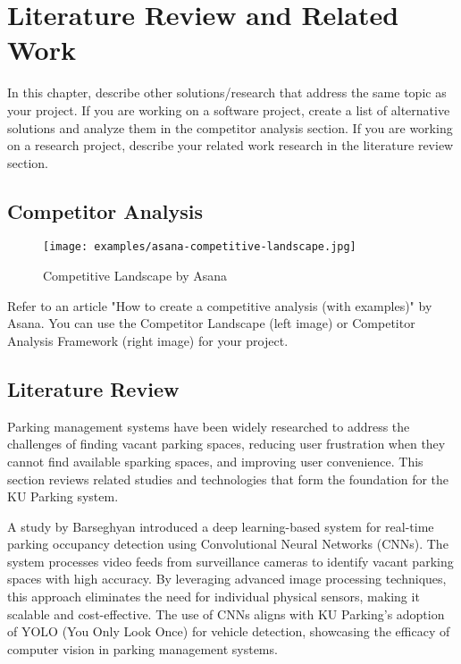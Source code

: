 \chapter{Literature Review and Related Work}
\label{chap:relatedworks}

In this chapter, describe other solutions/research that address the
same topic as your project. If you are working on a software project, create a
list of alternative solutions and analyze them in the competitor analysis section.
If you are working on a research project, describe your related work research in
the literature review section.

\section{Competitor Analysis}
\label{section:competitor-analysis}

\begin{figure}[h]
    \centering
    \texttt{[image: examples/asana-competitive-landscape.jpg]}
    \caption{Competitive Landscape by Asana}
\end{figure}

Refer to an article "How to create a competitive analysis (with
examples)" by Asana. You can use the Competitor Landscape (left image) or
Competitor Analysis Framework (right image) for your project.

\section{Literature Review}
\label{section:literature-review}

Parking management systems have been widely researched to address the challenges of finding vacant parking spaces, 
reducing user frustration when they cannot find available sparking spaces, and improving user convenience. 
This section reviews related studies and technologies that form the foundation for the KU Parking system.

A study by Barseghyan\cite{barseghyan2023parking} introduced a deep learning-based system for real-time parking occupancy detection using Convolutional Neural Networks (CNNs). 
The system processes video feeds from surveillance cameras to identify vacant parking spaces with high accuracy. 
By leveraging advanced image processing techniques, this approach eliminates the need for individual physical sensors, making it scalable and cost-effective. 
The use of CNNs aligns with KU Parking's adoption of YOLO (You Only Look Once) for vehicle detection, showcasing the efficacy of computer vision in parking management systems.

